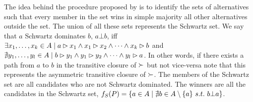 \begin{indented}[Schwartz]
	The idea behind the procedure proposed by \citet{Schwartz1972} is to identify the sets of alternatives such that every member in the set wins in simple majority all other alternatives outside the set. The union of all these sets represents the Schwartz set.
	We say that $a$ Schwartz dominates $b$, $a \bot b$, iff $\exists x_1, \dots, x_k \in A \suchthat a \rhd x_1 \land x_1 \rhd x_2 \land \dots \land x_k\rhd b$ and  $\nexists y_1, \dots, y_l \in A \suchthat b \rhd y_1 \land y_1 \rhd y_2 \land \dots \land y_l\rhd a$. In other words, if there exists a path from $a$ to $b$ in the transitive closure of $\succ$ but not vice-versa \textemdash note that this represents the asymmetric transitive closure of $\succ$.
	The members of the Schwartz set are all candidates who are not Schwartz dominated.
	The winners are all the candidates in the Schwartz set, $f_{S}(P)=\{a\in A \suchthat  \nexists b \in A \setminus\{a\} \ s.t. \ b \bot a \}$.
	
\end{indented}

